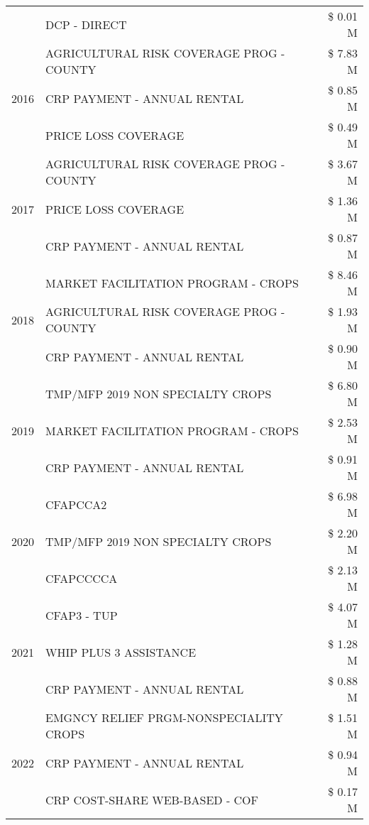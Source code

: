 \begin{tabular}{llr}
 & DCP - DIRECT & \$ 0.01 M \\
\cline{1-3}
\multirow[t]{3}{*}{2016} & AGRICULTURAL RISK COVERAGE PROG - COUNTY & \$ 7.83 M \\
 & CRP PAYMENT - ANNUAL RENTAL & \$ 0.85 M \\
 & PRICE LOSS COVERAGE & \$ 0.49 M \\
\cline{1-3}
\multirow[t]{3}{*}{2017} & AGRICULTURAL RISK COVERAGE PROG - COUNTY & \$ 3.67 M \\
 & PRICE LOSS COVERAGE & \$ 1.36 M \\
 & CRP PAYMENT - ANNUAL RENTAL & \$ 0.87 M \\
\cline{1-3}
\multirow[t]{3}{*}{2018} & MARKET FACILITATION PROGRAM - CROPS & \$ 8.46 M \\
 & AGRICULTURAL RISK COVERAGE PROG - COUNTY & \$ 1.93 M \\
 & CRP PAYMENT - ANNUAL RENTAL & \$ 0.90 M \\
\cline{1-3}
\multirow[t]{3}{*}{2019} & TMP/MFP 2019 NON SPECIALTY CROPS & \$ 6.80 M \\
 & MARKET FACILITATION PROGRAM - CROPS & \$ 2.53 M \\
 & CRP PAYMENT - ANNUAL RENTAL & \$ 0.91 M \\
\cline{1-3}
\multirow[t]{3}{*}{2020} & CFAPCCA2 & \$ 6.98 M \\
 & TMP/MFP 2019 NON SPECIALTY CROPS & \$ 2.20 M \\
 & CFAPCCCCA & \$ 2.13 M \\
\cline{1-3}
\multirow[t]{3}{*}{2021} & CFAP3 - TUP & \$ 4.07 M \\
 & WHIP PLUS 3 ASSISTANCE & \$ 1.28 M \\
 & CRP PAYMENT - ANNUAL RENTAL & \$ 0.88 M \\
\cline{1-3}
\multirow[t]{3}{*}{2022} & EMGNCY RELIEF PRGM-NONSPECIALITY CROPS & \$ 1.51 M \\
 & CRP PAYMENT - ANNUAL RENTAL & \$ 0.94 M \\
 & CRP COST-SHARE WEB-BASED - COF & \$ 0.17 M \\
\cline{1-3}
\bottomrule
\end{tabular}
